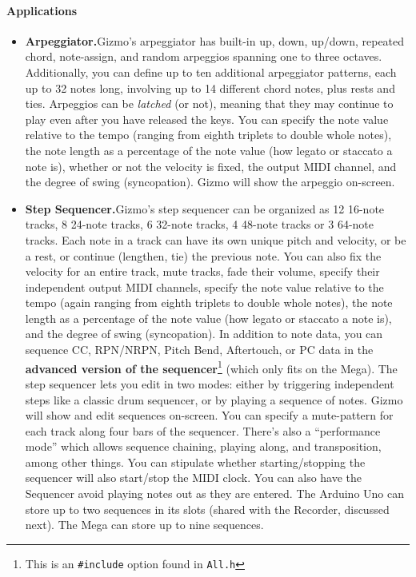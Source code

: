 \documentclass{article}
\begin{document}
\paragraph{Applications}
\begin{itemize}
\item {\bf Arpeggiator.}\quad Gizmo's arpeggiator has built-in up, down, up/down, repeated chord, note-assign, and random arpeggios spanning one to three octaves.  Additionally, you can define up to ten additional arpeggiator patterns, each up to 32 notes long, involving up to 14 different chord notes, plus rests and ties.  Arpeggios can be {\it latched} (or not), meaning that they may continue to play even after you have released the keys.  You can specify  the note value relative to the tempo (ranging from eighth triplets to double whole notes), the note length as a percentage of the note value (how legato or staccato a note is), whether or not the velocity is fixed, the output MIDI channel, and the degree of swing (syncopation).  Gizmo will show the arpeggio on-screen.

\item {\bf Step Sequencer.}\quad Gizmo's step sequencer can be organized as 12 16-note tracks, 8 24-note tracks, 6 32-note tracks, 4 48-note tracks or 3 64-note tracks.  Each note in a track can have its own unique pitch and velocity, or be a rest, or continue (lengthen, tie) the previous note.  You can also fix the velocity for an entire track, mute tracks, fade their volume, specify their independent output MIDI channels, specify the note value relative to the tempo (again ranging from eighth triplets to double whole notes), the note length as a percentage of the note value (how legato or staccato a note is), and the degree of swing (syncopation).   In addition to note data, you can sequence CC, RPN/NRPN, Pitch Bend, Aftertouch, or PC data in the {\bf advanced version of the sequencer}\footnote{This is an \texttt{\#include} option found in \texttt{All.h}} (which only fits on the Mega).  The step sequencer lets you edit in two modes: either by triggering independent steps like a classic drum sequencer, or by playing a sequence of notes.  Gizmo will show and edit sequences on-screen.   You can specify a mute-pattern for each track along four bars of the sequencer.  There's also a ``performance mode'' which allows sequence chaining, playing along, and transposition, among other things.  You can stipulate whether starting/stopping the sequencer will also start/stop the MIDI clock.  You can also have the Sequencer avoid playing notes out as they are entered.  The Arduino Uno can store up to two sequences in its slots (shared with the Recorder, discussed next).  The Mega can store up to nine sequences.


\end{itemize}
\end{document}
